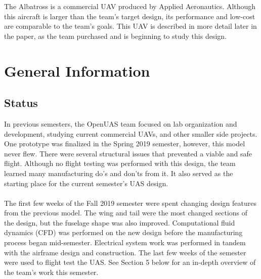 \documentclass{article}
\begin{document}
\noindent The Albatross is a commercial UAV produced by Applied Aeronautics. Although this aircraft is larger than the team's target design, its performance and low-cost are comparable to the team's goals. This UAV is described in more detail later in the paper, as the team purchased and is beginning to study this design. \\


\section{General Information}

\subsection{Status}
In previous semesters, the OpenUAS team focused on lab organization and development, studying current commercial UAVs, and other smaller side projects. One prototype was finalized in the Spring 2019 semester, however, this model never flew. There were several structural issues that prevented a viable and safe flight. Although no flight testing was performed with this design, the team learned many manufacturing do's and don'ts from it. It also served as the starting place for the current semester's UAS design.\\\\
The first few weeks of the Fall 2019 semester were spent changing design features from the previous model. The wing and tail were the most changed sections of the design, but the fuselage shape was also improved. Computational fluid dynamics (CFD) was performed on the new design before the manufacturing process began mid-semester. Electrical system work was performed in tandem with the airframe design and construction. The last few weeks of the semester were used to flight test the UAS. See Section 5 below for an in-depth overview of the team's work this semester. \\\\
\end{document}
